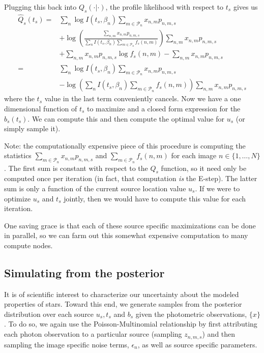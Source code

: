 \documentclass[11pt]{article}
\begin{document}
\begin{itemize}
Plugging this back into $Q_s(\cdot | \cdot)$, the profile likelihood with respect to $t_s$ gives us 
\begin{align}
  \hat Q_s(t_s) 
    =& \sum_{n} \log I(t_s, \beta_n) \sum_{m \in \mathcal{P}_n} x_{n,m} p_{n,m,s} \\
    & + \log\left( \frac{ \sum_{n,m} x_{n,m} p_{n,m,s} }{\sum_{n} I(t_s, \beta_n)\sum_{m \in \mathcal{P}_n} f_s(n,m)} \right) \sum_{n,m} x_{n,m} p_{n,m,s} \\
    & + \sum_{n,m} x_{n,m} p_{n,m,s} \log f_s(n,m) - \sum_{n,m} x_{n,m} p_{n,m,s} \\
    =& \sum_{n} \log I(t_s, \beta_n) \sum_{m\in \mathcal{P}_n} x_{n,m} p_{n,m,s} \\
    & - \log\left( \sum_{n} I(t_s, \beta_n) \sum_{m \in \mathcal{P}_n} f_s(n,m) \right) \sum_{n,m} x_{n,m} p_{n,m,s}
\end{align}
where the $t_s$ value in the last term conveniently cancels.  Now we have a one dimensional function of $t_s$ to maximize and a closed form expression for the $\hat b_s(t_s)$.  We can compute this and then compute the optimal value for $u_s$ (or simply sample it).  

Note: the computationally expensive piece of this procedure is computing the statistics $\sum_{m\in \mathcal{P}_n} x_{n,m} p_{n,m,s}$ and $\sum_{m \in \mathcal{P}_n} f_s(n,m)$ for each image $n \in \{1, \dots, N\}$.  The first sum is constant with respect to the $Q_s$ function, so it need only be computed once per iteration (in fact, that computation \emph{is} the E-step).  The latter sum is only a function of the current source location value $u_s$.  If we were to optimize $u_s$ and $t_s$ jointly, then we would have to compute this value for each iteration.    

One saving grace is that each of these source specific maximizations can be done in parallel, so we can farm out this somewhat expensive computation to many compute nodes.  
\end{itemize}

\subsection{Simulating from the posterior}
It is of scientific interest to characterize our uncertainty about the modeled properties of stars.  Toward this end, we generate samples from the posterior distribution over each source $u_s, t_s$ and $b_s$ given the photometric observations, $\{ x \}$.  To do so, we again use the Poisson-Multinomial relationship by first attributing each photon observation to a particular source (sampling $z_{n,m,s}$) and then sampling the image specific noise terms, $\epsilon_n$, as well as source specific parameters.  
\end{document}
